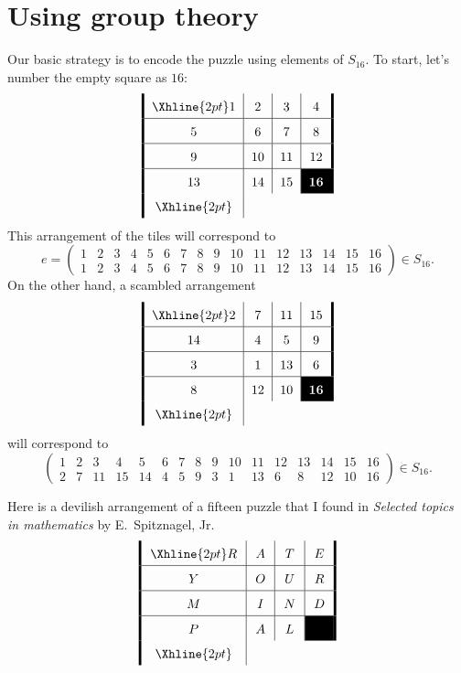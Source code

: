 \documentclass{ximera}
\begin{document}
\section{Using group theory}

Our basic strategy is to encode the puzzle using elements of $S_{16}$.
To start, let's number the empty square as $16$:
\[
\arraycolsep=6pt\def\arraystretch{1.6}
\begin{array}{!{\vline width 2pt}c|c|c|c!{\vline width 2pt}}
    \Xhline{2pt}
    1  & 2  & 3  & 4 \\ \hline
    5  & 6  & 7  & 8 \\ \hline
    9  & 10 & 11 & 12 \\ \hline
    13 & 14 & 15 & \cellcolor{black}\textcolor{white}{\textbf{16}} \\
    \Xhline{2pt}
\end{array}
\]
This arrangement of the tiles will correspond to
\[
e = \left(\begin{smallmatrix}
  1 & 2 & 3 & 4 & 5 & 6 & 7 & 8 & 9 & 10 & 11 & 12 & 13 & 14 & 15 & 16\\
  1 & 2 & 3 & 4 & 5 & 6 & 7 & 8 & 9 & 10 & 11 & 12 & 13 & 14 & 15 & 16
\end{smallmatrix}\right)\in S_{16}.
\]
On the other hand, a scambled arrangement 
\[
\arraycolsep=6pt\def\arraystretch{1.6}
\begin{array}{!{\vline width 2pt}c|c|c|c!{\vline width 2pt}}
    \Xhline{2pt}
    2 & 7  & 11 & 15\\ \hline
    14 & 4  & 5  & 9 \\ \hline
    3  & 1  & 13 & 6  \\ \hline
    8  & 12 & 10 & \cellcolor{black}\textcolor{white}{\textbf{16}} \\
    \Xhline{2pt}
\end{array}
\]
will correspond to
\[
\left(\begin{smallmatrix}
  1 & 2 & 3 & 4 & 5 & 6 & 7 & 8 & 9 & 10 & 11 & 12 & 13 & 14 & 15 & 16\\
  2 & 7 & 11& 15& 14& 4 & 5 & 9 & 3 & 1  & 13 &  6 &  8 & 12 & 10 & 16
\end{smallmatrix}\right)\in S_{16}.
\]



\begin{exercise}
  Here is a devilish arrangement of a fifteen puzzle that I found in
  \textit{Selected topics in mathematics} by E.\ Spitznagel, Jr.
  \[
  \arraycolsep=7pt\def\arraystretch{1.6}
  \begin{array}{!{\vline width 2pt}c|c|c|c!{\vline width 2pt}}
    \Xhline{2pt}
    R  & A  & T  & E \\ \hline
    Y  & O  & U  & R \\ \hline
    M  & I & N & D \\ \hline
    P & A & L & \cellcolor{black}\\
    \Xhline{2pt}
  \end{array}
  \]
\end{exercise}
\end{document}
